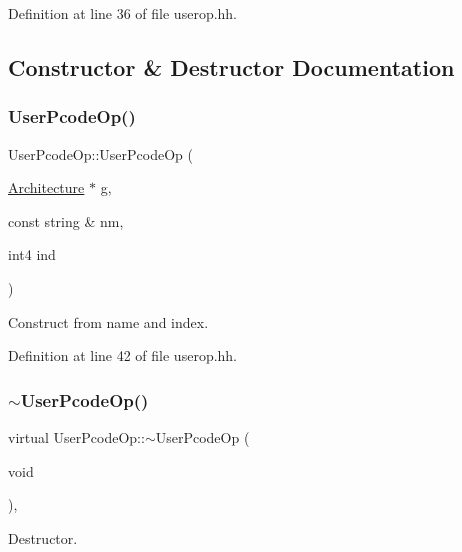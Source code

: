 Definition at line 36 of file userop.\+hh.



\subsection{Constructor \& Destructor Documentation}
\mbox{\label{class_user_pcode_op_a291d0e1a6d9c824de639859ce19554c1}} 
\subsubsection{\texorpdfstring{UserPcodeOp()}{UserPcodeOp()}}
{\footnotesize\ttfamily User\+Pcode\+Op\+::\+User\+Pcode\+Op (\begin{DoxyParamCaption}\item[{\mbox{\hyperlink{class_architecture}{Architecture}} $\ast$}]{g,  }\item[{const string \&}]{nm,  }\item[{int4}]{ind }\end{DoxyParamCaption})\hspace{0.3cm}{\ttfamily [inline]}}



Construct from name and index. 



Definition at line 42 of file userop.\+hh.

\mbox{\label{class_user_pcode_op_a08600cf33539413bf36106e945d8a470}} 
\subsubsection{\texorpdfstring{$\sim$UserPcodeOp()}{~UserPcodeOp()}}
{\footnotesize\ttfamily virtual User\+Pcode\+Op\+::$\sim$\+User\+Pcode\+Op (\begin{DoxyParamCaption}\item[{void}]{ }\end{DoxyParamCaption})\hspace{0.3cm}{\ttfamily [inline]}, {\ttfamily [virtual]}}



Destructor. 



